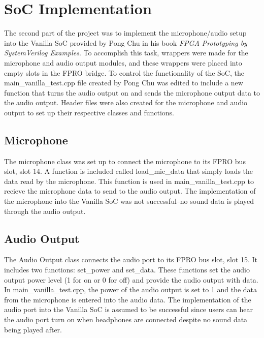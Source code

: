 \documentclass{article}
\begin{document}
\section{SoC Implementation}
The second part of the project was to implement the microphone/audio setup into the Vanilla SoC provided by Pong Chu in his book \textit{FPGA Prototyping by SystemVerilog Examples}. To accomplish this task, wrappers were made for the microphone and audio output modules, and these wrappers were placed into empty slots in the FPRO bridge. To control the functionality of the SoC, the main\_vanilla\_test.cpp file created by Pong Chu was edited to include a new function that turns the audio output on and sends the microphone output data to the audio output. Header files were also created for the microphone and audio output to set up their respective classes and functions. 

\subsection{Microphone}
The microphone class was set up to connect the microphone to its FPRO bus slot, slot 14. A function is included called load\_mic\_data that simply loads the data read by the microphone. This function is used in main\_vanilla\_test.cpp to recieve the microphone data to send to the audio output. The implementation of the microphone into the Vanilla SoC was not successful--no sound data is played through the audio output. 

\subsection{Audio Output}
The Audio Output class connects the audio port to its FPRO bus slot, slot 15. It includes two functions: set\_power and set\_data. These functions set the audio output power level (1 for on or 0 for off) and provide the audio output with data. In main\_vanilla\_test.cpp, the power of the audio output is set to 1 and the data from the microphone is entered into the audio data. The implementation of the audio port into the Vanilla SoC is assumed to be successful since users can hear the audio port turn on when headphones are connected despite no sound data being played after.
\end{document}
